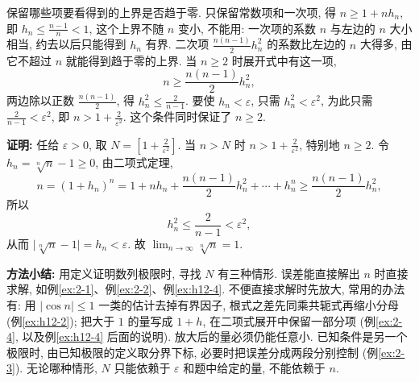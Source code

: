 \documentclass[UTF8,openany]{ctexbook}
\theoremstyle{chinesetextbook}
\newenvironment{cnproof}{\par\indent\textbf{证明:} \ignorespaces}{\par}
\begin{document}
保留哪些项要看得到的上界是否趋于零. 只保留常数项和一次项, 得 $n\ge1+nh_n$, 即 $\displaystyle h_n\le\frac{n-1}n<1$, 这个上界不随 $n$ 变小, 不能用: 一次项的系数 $n$ 与左边的 $n$ 大小相当, 约去以后只能得到 $h_n$ 有界. 二次项 $\displaystyle\frac{n(n-1)}2h_n^2$ 的系数比左边的 $n$ 大得多, 由它不超过 $n$ 就能得到趋于零的上界. 当 $n\ge2$ 时展开式中有这一项,
\[
n\ge\frac{n(n-1)}2h_n^2,
\]
两边除以正数 $\displaystyle\frac{n(n-1)}2$, 得 $\displaystyle h_n^2\le\frac2{n-1}$. 要使 $h_n<\varepsilon$, 只需 $h_n^2<\varepsilon^2$, 为此只需 $\displaystyle\frac2{n-1}<\varepsilon^2$, 即 $\displaystyle n>1+\frac2{\varepsilon^2}$. 这个条件同时保证了 $n\ge2$.
\begin{cnproof}
任给 $\varepsilon>0$, 取 $\displaystyle N=\left[1+\frac2{\varepsilon^2}\right]$. 当 $n>N$ 时 $\displaystyle n>1+\frac2{\varepsilon^2}$, 特别地 $n\ge2$. 令 $h_n=\sqrt[n]n-1\ge0$, 由二项式定理,
\[
n=(1+h_n)^n=1+nh_n+\frac{n(n-1)}2h_n^2+\cdots+h_n^n\ge\frac{n(n-1)}2h_n^2,
\]
所以
\[
h_n^2\le\frac2{n-1}<\varepsilon^2,
\]
从而 $\bigl|\sqrt[n]n-1\bigr|=h_n<\varepsilon$. 故 $\displaystyle\lim_{n\to\infty}\sqrt[n]n=1$.
\end{cnproof}
\par\indent\textbf{方法小结:} 用定义证明数列极限时, 寻找 $N$ 有三种情形. 误差能直接解出 $n$ 时直接求解, 如例\ref{ex:2-1}、例\ref{ex:2-2}、例\ref{ex:h12-4}. 不便直接求解时先放大, 常用的办法有: 用 $|\cos n|\le1$ 一类的估计去掉有界因子, 根式之差先同乘共轭式再缩小分母 (例\ref{ex:h12-2}); 把大于 $1$ 的量写成 $1+h$, 在二项式展开中保留一部分项 (例\ref{ex:2-4}, 以及例\ref{ex:h12-4} 后面的说明). 放大后的量必须仍能任意小. 已知条件是另一个极限时, 由已知极限的定义取分界下标, 必要时把误差分成两段分别控制 (例\ref{ex:2-3}). 无论哪种情形, $N$ 只能依赖于 $\varepsilon$ 和题中给定的量, 不能依赖于 $n$.
\end{document}
